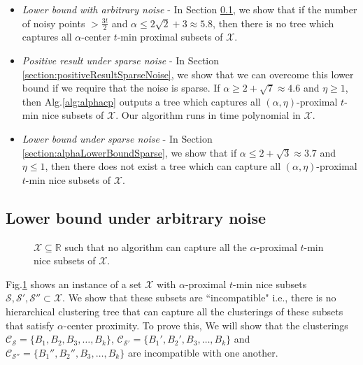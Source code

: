\documentclass[anon,12pt]{colt2016} %
\newcommand{\mc}{\mathcal}
\begin{document}

\begin{itemize}
\item {\it Lower bound with arbitrary noise} - In Section \ref{section:alphaLowerBoundArbitrary}, we show that if the number of noisy points $> \frac{3t}{2}$ and $\alpha \le 2\sqrt{2} + 3 \approx 5.8$, then there is no tree which captures all $\alpha$-center $t$-min proximal subsets of $\mc X$.
\item  {\it Positive result under sparse noise} - In Section \ref{section:positiveResultSparseNoise}, we show that we can overcome this lower bound if we require that the noise is sparse. If $\alpha \ge 2 + \sqrt{7} \approx 4.6$ and $\eta \ge 1$, then Alg.\ref{alg:alphacp} outputs a tree which captures all $(\alpha, \eta)$-proximal $t$-min nice subsets of $\mc X$. Our algorithm runs in time polynomial in $\mc X$. 
\item  {\it Lower bound under sparse noise} - In Section \ref{section:alphaLowerBoundSparse}, we show that if $\alpha \le 2 + \sqrt{3} \approx 3.7$ and $\eta \le 1$, then there does not exist a tree which can capture all $(\alpha, \eta)$-proximal $t$-min nice subsets of $\mc X$.
\end{itemize} 

\subsection{Lower bound under arbitrary noise}
\label{section:alphaLowerBoundArbitrary}

\begin{figure}

\caption{$\mc X \subseteq \mathbb{R}$ such that no algorithm can capture all the $\alpha$-proximal $t$-min nice subsets of $\mc X$. } 
\label{fig:nosparsealg}
\end{figure}

Fig.\ref{fig:nosparsealg} shows an instance of a set $\mc X$ with $\alpha$-proximal $t$-min nice subsets $\mc S, \mc S', \mc S'' \subset \mc X$. We show that these subsets are ``incompatible" i.e., there is no  hierarchical clustering tree that can capture all the clusterings of these subsets that satisfy $\alpha$-center proximity. To prove this, We will show that the clusterings $\mc C_{\mc S} = \{B_1, B_2, B_3, \ldots, B_k\}$, $\mc C_{\mc S'} = \{B_1', B_2', B_3, \ldots, B_k\}$ and $\mc C_{\mc S''} = \{B_1'', B_2'', B_3, \ldots, B_k\}$ are incompatible with one another.
\end{document}
